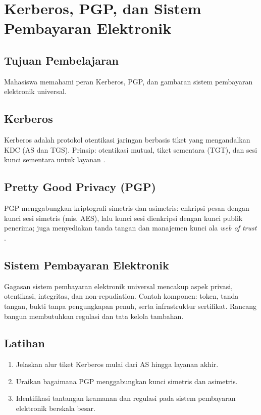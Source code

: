 \documentclass[../main.tex]{subfiles}
\begin{document}
\chapter{Kerberos, PGP, dan Sistem Pembayaran Elektronik}

\section{Tujuan Pembelajaran}
Mahasiswa memahami peran Kerberos, PGP, dan gambaran sistem pembayaran elektronik universal.

\section{Kerberos}
Kerberos adalah protokol otentikasi jaringan berbasis tiket yang mengandalkan KDC (AS dan TGS). Prinsip: otentikasi mutual, tiket sementara (TGT), dan sesi kunci sementara untuk layanan \citep{kerberos,stallings}.

\section{Pretty Good Privacy (PGP)}
PGP menggabungkan kriptografi simetris dan asimetris: enkripsi pesan dengan kunci sesi simetris (mis. AES), lalu kunci sesi dienkripsi dengan kunci publik penerima; juga menyediakan tanda tangan dan manajemen kunci ala \emph{web of trust} \citep{pgp,stallings}.

\section{Sistem Pembayaran Elektronik}
Gagasan sistem pembayaran elektronik universal mencakup aspek privasi, otentikasi, integritas, dan non-repudiation. Contoh komponen: token, tanda tangan, bukti tanpa pengungkapan penuh, serta infrastruktur sertifikat. Rancang bangun membutuhkan regulasi dan tata kelola tambahan.

\section{Latihan}
\begin{enumerate}
  \item Jelaskan alur tiket Kerberos mulai dari AS hingga layanan akhir.
  \item Uraikan bagaimana PGP menggabungkan kunci simetris dan asimetris.
  \item Identifikasi tantangan keamanan dan regulasi pada sistem pembayaran elektronik berskala besar.
\end{enumerate}
\end{document}
